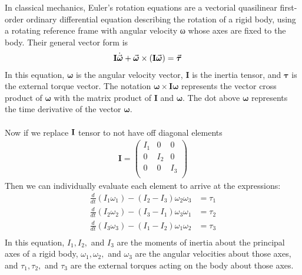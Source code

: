 \documentclass{article}
\begin{document}
\begin{example*}
In classical mechanics, Euler's rotation equations are a vectorial quasilinear first-order ordinary differential equation describing the rotation of a rigid body, using a rotating reference frame with angular velocity ω whose axes are fixed to the body. Their general vector form is 
\begin{align*}
\vb{I}\dot{\va*{\omega}} + \va*{\omega} \times (\vb{I}\va*{\omega}) &= \va*{\tau} \
\end{align*}
In this equation, $\boldsymbol{\omega}$ is the angular velocity vector, $\mathbf{I}$ is the inertia tensor, and $\boldsymbol{\tau}$ is the external torque vector. The notation $\boldsymbol{\omega} \times \mathbf{I}\boldsymbol{\omega}$ represents the vector cross product of $\boldsymbol{\omega}$ with the matrix product of $\mathbf{I}$ and $\boldsymbol{\omega}$. The dot above $\boldsymbol{\omega}$ represents the time derivative of the vector $\boldsymbol{\omega}$.\\
\\
Now if we replace $\vb{I}$ tensor to not have off diagonal elements\\
\begin{align*}
\mathbf{I} =
\begin{pmatrix}
I_1 & 0 & 0 \\
0 & I_2 & 0 \\
0 & 0 & I_3 \\
\end{pmatrix}
\end{align*}
Then we can individually evaluate each element to arrive at the expressions: \\
\begin{align*}
\frac{d}{dt}\left(I_1\omega_1\right) - (I_2 - I_3)\omega_2\omega_3 &= \tau_1 \\
\frac{d}{dt}\left(I_2\omega_2\right) - (I_3 - I_1)\omega_3\omega_1 &= \tau_2 \\
\frac{d}{dt}\left(I_3\omega_3\right) - (I_1 - I_2)\omega_1\omega_2 &= \tau_3 \\
\end{align*}
In this equation, $I_1, I_2,$ and $I_3$ are the moments of inertia about the principal axes of a rigid body, $\omega_1, \omega_2,$ and $\omega_3$ are the angular velocities about those axes, and $\tau_1, \tau_2,$ and $\tau_3$ are the external torques acting on the body about those axes.
\end{example*}
\end{document}
